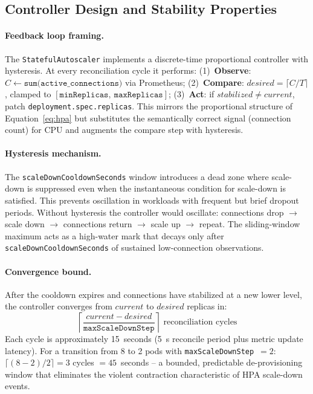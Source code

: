 \documentclass[twocolumn]{svjour3}
\begin{document}
\subsection{Controller Design and Stability Properties}
\label{sec:controller_stability}

\paragraph{Feedback loop framing.}
The \texttt{StatefulAutoscaler} implements a discrete-time proportional controller with
hysteresis. At every reconciliation cycle it performs: (1)~\textbf{Observe}:
$C \gets \texttt{sum(active\_connections)}$ via Prometheus; (2)~\textbf{Compare}:
$desired = \lceil C / T \rceil$, clamped to $[\texttt{minReplicas},\ \texttt{maxReplicas}]$;
(3)~\textbf{Act}: if $stabilized \neq current$, patch \texttt{deployment.spec.replicas}. This
mirrors the proportional structure of Equation~\ref{eq:hpa} but substitutes the semantically
correct signal (connection count) for CPU and augments the compare step with hysteresis.

\paragraph{Hysteresis mechanism.}
The \texttt{scaleDownCooldownSeconds} window introduces a dead zone where scale-down is
suppressed even when the instantaneous condition for scale-down is satisfied. This prevents
oscillation in workloads with frequent but brief dropout periods. Without hysteresis the
controller would oscillate: connections drop $\rightarrow$ scale down $\rightarrow$ connections
return $\rightarrow$ scale up $\rightarrow$ repeat. The sliding-window maximum acts as a
high-water mark that decays only after \texttt{scaleDownCooldownSeconds} of sustained
low-connection observations.

\paragraph{Convergence bound.}
After the cooldown expires and connections have stabilized at a new lower level, the controller
converges from $current$ to $desired$ replicas in:
\begin{equation}
\left\lceil \frac{current - desired}{\texttt{maxScaleDownStep}} \right\rceil \text{ reconciliation cycles}
\label{eq:convergence}
\end{equation}
Each cycle is approximately 15~seconds (5~s reconcile period plus metric update latency).
For a transition from 8 to 2 pods with \texttt{maxScaleDownStep}~$= 2$:
$\lceil (8-2)/2 \rceil = 3$ cycles $= 45$~seconds -- a bounded, predictable de-provisioning
window that eliminates the violent contraction characteristic of HPA scale-down events.
\end{document}

